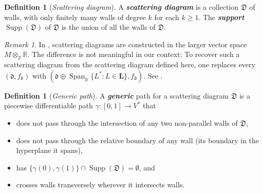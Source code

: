 \documentclass{amsart}
\theoremstyle{definition}
\newtheorem{definition}[proposition]{Definition}
\theoremstyle{remark}
\newtheorem{remark}[proposition]{Remark}
\numberwithin{equation}{section}
\newcommand{\newword}[1]{\textbf{\emph{#1}}}
\newcommand{\integers}{\mathbb Z}
\newcommand{\reals}{\mathbb R}
\newcommand{\set}[1]{{\lbrace #1 \rbrace}}
\newcommand{\D}{{\mathfrak D}}
\newcommand{\0}{{\mathbf{0}}}
\DeclareMathOperator{\Span}{Span}
\renewcommand{\L}{\mathbf{L}}
\newcommand{\Supp}{\operatorname{Supp}}
\renewcommand{\d}{{\mathfrak d}}
\begin{document}
\begin{definition}[\emph{Scattering diagram}]\label{scat def}
A \newword{scattering diagram} is a collection $\D$ of walls, with only finitely many walls of degree $k$ for each $k\ge1$.
The \newword{support} $\Supp(\D)$ of $\D$ is the union of all the walls of $\D$.
\end{definition}

\begin{remark}\label{useless dimensions}
In \cite{GHKK}, scattering diagrams are constructed in the larger vector space $M\otimes_\integers\reals$.
The difference is not meaningful in our context:  
To recover such a scattering diagram from the scattering diagram defined here, one replaces every $(\d,f_\d)$ with $(\d\oplus\Span_\reals\set{L^*:L\in\L},f_\d)$.
See \cite[Cite specific remark!!]{scatfan}.
\end{remark}

\begin{definition}[\emph{Generic path}]\label{generic def}
A \newword{generic} path for a scattering diagram $\D$ is a piecewise differentiable path $\gamma:[0,1]\to V^*$ that
\begin{itemize}
\item does not pass through the intersection of any two non-parallel walls of $\D$,
\item does not pass through the relative boundary of any wall (its boundary in the hyperplane it spans),
\item has $\set{\gamma(0),\gamma(1)}\cap\Supp(\D)=\emptyset$, and
\item crosses walls transversely wherever it intersects walls.
\end{itemize}
\end{definition}
\end{document}
